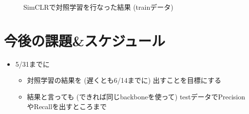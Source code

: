 \documentclass[a4j]{ujarticle}
\begin{document}
\begin{itemize}
            \begin{figure}[h]
                \centering
                \caption{SimCLR\cite{simclr}で対照学習を行なった結果 (trainデータ)}
            \end{figure}


        \end{itemize}

\clearpage

    \section{今後の課題\&スケジュール}
        \begin{itemize}
            \item 5/31までに
            \begin{itemize}
                \item 対照学習の結果を (遅くとも6/14までに) 出すことを目標にする
                \item 結果と言っても (できれば同じbackboneを使って) testデータでPrecisionやRecallを出すところまで
            \end{itemize}
        \end{itemize}
\end{document}
